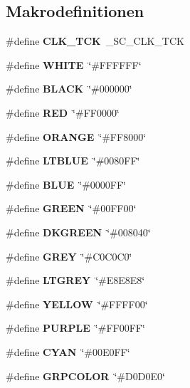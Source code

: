 \subsection*{Makrodefinitionen}
\begin{CompactItemize}
\item 
\#define {\bf CLK\_\-TCK}~\_\-SC\_\-CLK\_\-TCK
\item 
\#define {\bf WHITE}~\char`\"{}\#FFFFFF\char`\"{}
\item 
\#define {\bf BLACK}~\char`\"{}\#000000\char`\"{}
\item 
\#define {\bf RED}~\char`\"{}\#FF0000\char`\"{}
\item 
\#define {\bf ORANGE}~\char`\"{}\#FF8000\char`\"{}
\item 
\#define {\bf LTBLUE}~\char`\"{}\#0080FF\char`\"{}
\item 
\#define {\bf BLUE}~\char`\"{}\#0000FF\char`\"{}
\item 
\#define {\bf GREEN}~\char`\"{}\#00FF00\char`\"{}
\item 
\#define {\bf DKGREEN}~\char`\"{}\#008040\char`\"{}
\item 
\#define {\bf GREY}~\char`\"{}\#C0C0C0\char`\"{}
\item 
\#define {\bf LTGREY}~\char`\"{}\#E8E8E8\char`\"{}
\item 
\#define {\bf YELLOW}~\char`\"{}\#FFFF00\char`\"{}
\item 
\#define {\bf PURPLE}~\char`\"{}\#FF00FF\char`\"{}
\item 
\#define {\bf CYAN}~\char`\"{}\#00E0FF\char`\"{}
\item 
\#define {\bf GRPCOLOR}~\char`\"{}\#D0D0E0\char`\"{}
\end{CompactItemize}
